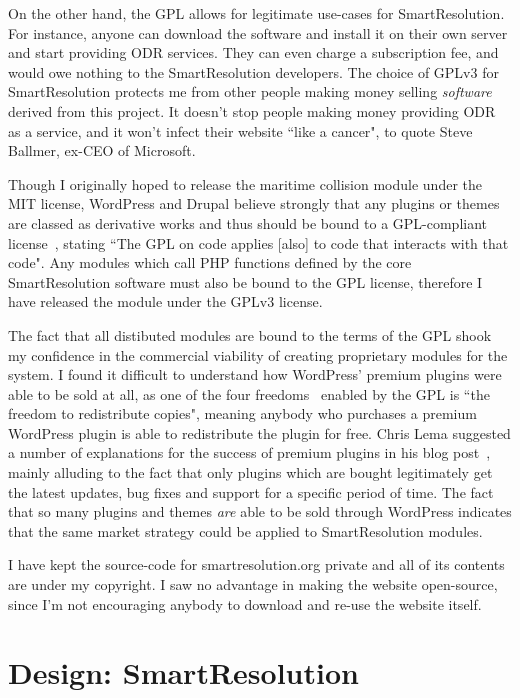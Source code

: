 On the other hand, the GPL allows for legitimate use-cases for SmartResolution. For instance, anyone can download the software and install it on their own server and start providing ODR services. They can even charge a subscription fee, and would owe nothing to the SmartResolution developers. The choice of GPLv3 for SmartResolution protects me from other people making money selling \emph{software} derived from this project. It doesn't stop people making money providing ODR as a service, and it won't infect their website ``like a cancer", to quote Steve Ballmer, ex-CEO of Microsoft.~\cite{linuxCancer}

Though I originally hoped to release the maritime collision module under the MIT license, WordPress and Drupal believe strongly that any plugins or themes are classed as derivative works and thus should be bound to a GPL-compliant license~\cite{wordpress:gpl}, stating ``The GPL on code applies [also] to code that interacts with that code". Any modules which call PHP functions defined by the core SmartResolution software must also be bound to the GPL license, therefore I have released the module under the GPLv3 license.

The fact that all distibuted modules are bound to the terms of the GPL shook my confidence in the commercial viability of creating proprietary modules for the system. I found it difficult to understand how WordPress' premium plugins were able to be sold at all, as one of the four freedoms~\cite{fourFreedoms} enabled by the GPL is ``the freedom to redistribute copies", meaning anybody who purchases a premium WordPress plugin is able to redistribute the plugin for free. Chris Lema suggested a number of explanations for the success of premium plugins in his blog post~\cite{chrisLema}, mainly alluding to the fact that only plugins which are bought legitimately get the latest updates, bug fixes and support for a specific period of time. The fact that so many plugins and themes \emph{are} able to be sold through WordPress indicates that the same market strategy could be applied to SmartResolution modules.

I have kept the source-code for smartresolution.org private and all of its contents are under my copyright. I saw no advantage in making the website open-source, since I'm not encouraging anybody to download and re-use the website itself.

\section{Design: SmartResolution}

